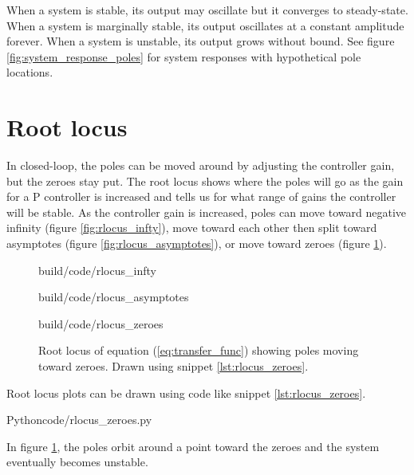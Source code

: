 When a system is stable, its output may oscillate but it converges to
steady-state. When a system is marginally stable, its output oscillates at a
constant amplitude forever. When a system is unstable, its output grows without
bound. See figure \ref{fig:system_response_poles} for system responses with
hypothetical pole locations.

\section{Root locus}

In closed-loop, the poles can be moved around by adjusting the controller gain,
but the zeroes stay put. The root locus shows where the poles will go as the
gain for a P controller is increased and tells us for what range of gains the
controller will be stable. As the controller gain is increased, poles can move
toward negative infinity (figure \ref{fig:rlocus_infty}), move toward each other
then split toward asymptotes (figure \ref{fig:rlocus_asymptotes}), or move
toward zeroes (figure \ref{fig:rlocus_zeroes}).

\begin{figure}
  \begin{minisvg}{build/code/rlocus_infty}
    \caption{Root locus showing pole moving toward negative infinity.}
    \label{fig:rlocus_infty}
  \end{minisvg}
  \hfill
  \begin{minisvg}{build/code/rlocus_asymptotes}
    \caption{Root locus showing poles moving toward asymptotes.}
    \label{fig:rlocus_asymptotes}
  \end{minisvg}
  \begin{minisvg}{build/code/rlocus_zeroes}
    \caption{Root locus of equation (\ref{eq:transfer_func}) showing poles
      moving toward zeroes. Drawn using snippet \ref{lst:rlocus_zeroes}.}
    \label{fig:rlocus_zeroes}
  \end{minisvg}
\end{figure}

Root locus plots can be drawn using code like snippet \ref{lst:rlocus_zeroes}.

\begin{code}{Python}{code/rlocus_zeroes.py}
  \caption{Root locus in Python.}
  \label{lst:rlocus_zeroes}
\end{code}

In figure \ref{fig:rlocus_zeroes}, the poles orbit around a point toward the
zeroes and the \gls{system} eventually becomes unstable.

